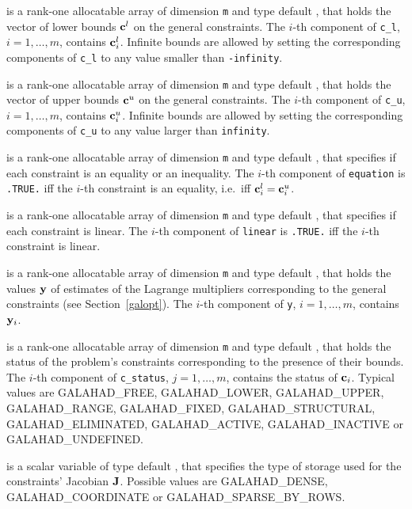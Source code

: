 \documentclass{galahad}
\newcommand{\sym}{\sf\small}
\begin{document}
\begin{description}
 is a rank-one allocatable array of dimension {\tt m} and type
default \realdp, that holds the vector of lower bounds ${\mathbf{c}}^{l}$
on the general constraints. The $i$-th component of
{\tt c\_l}, $i = 1, \ldots , m$, contains ${\mathbf{c}}_{i}^{l}$.
Infinite bounds are allowed by setting the corresponding
components of {\tt c\_l} to any value smaller than {\tt -infinity}.

 is a rank-one allocatable array of dimension {\tt m} and type
default \realdp, that holds the vector of upper bounds ${\mathbf{c}}^{u}$
on the general constraints. The $i$-th component of
{\tt c\_u}, $i = 1,  \ldots ,  m$, contains ${\mathbf{c}}_{i}^{u}$.
Infinite bounds are allowed by setting the corresponding
components of {\tt c\_u} to any value larger than {\tt infinity}.

 is a rank-one allocatable array of dimension {\tt m} and
type default \logical, that specifies if each constraint is an equality
or an inequality. The $i$-th component of {\tt equation} is {\tt .TRUE.}
iff the $i$-th constraint is an equality, i.e.\ iff ${\mathbf{c}}^l_i = {\mathbf{c}}^u_i$.

 is a rank-one allocatable array of dimension {\tt m} and
type default \logical, that specifies if each constraint is linear.
The $i$-th component of {\tt linear} is {\tt .TRUE.}
iff the $i$-th constraint is linear.

 is a rank-one allocatable array of dimension {\tt m} and type
default \realdp, that holds
the values ${\mathbf{y}}$ of estimates  of the Lagrange multipliers
corresponding to the general constraints (see Section~\ref{galopt}).
The $i$-th component of {\tt y}, $i = 1,  \ldots ,  m$, contains ${\mathbf{y}}_{i}$.

 is  a rank-one allocatable array of dimension {\tt m} and type
default \integer, that holds the status of the problem's constraints
corresponding to the presence of their bounds. The $i$-th component of
{\tt c\_status}, $j = 1,  \ldots ,  m$, contains the status of ${\mathbf{c}}_i$.
Typical values are
{\sym GALAHAD\_FREE},  {\sym GALAHAD\_LOWER}, {\sym GALAHAD\_UPPER},
{\sym GALAHAD\_RANGE}, {\sym GALAHAD\_FIXED}, {\sym GALAHAD\_STRUCTURAL},
{\sym GALAHAD\_ELIMINATED}, {\sym GALAHAD\_ACTIVE},
{\sym GALAHAD\_INACTIVE} or {\sym GALAHAD\_UNDEFINED}.

 is a scalar variable of type default \integer,
that specifies the type of storage used for the
constraints' Jacobian ${\mathbf{J}}$.
Possible values are {\sym GALAHAD\_DENSE}, {\sym GALAHAD\_COORDINATE}
or {\sym GALAHAD\_SPARSE\_BY\_ROWS}.


\end{description}
\end{document}
